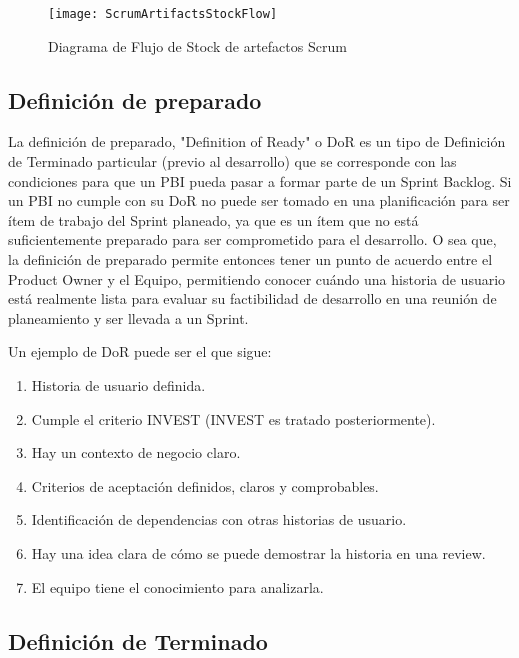 \begin{figure}[h]
  \centering
  \texttt{[image: ScrumArtifactsStockFlow]}
  \caption{Diagrama de Flujo de Stock de artefactos Scrum}
  \centering
  \label{fig:ScrumArtifactsStockFlow} %
\end{figure}

\subsection{Definición de preparado}

La definición de preparado, "Definition of Ready" o DoR es un tipo de Definición de Terminado particular (previo al desarrollo) que se corresponde con las condiciones para que un PBI pueda pasar a formar parte de un Sprint Backlog. Si un PBI no cumple con su DoR no puede ser tomado en una planificación para ser ítem de trabajo del Sprint planeado, ya que es un ítem que no está suficientemente preparado para ser comprometido para el desarrollo. O sea que, la definición de preparado permite entonces tener un punto de acuerdo entre el Product Owner y el Equipo, permitiendo conocer cuándo una historia de usuario está realmente lista para evaluar su factibilidad de desarrollo en una reunión de planeamiento y ser llevada a un Sprint.

Un ejemplo de DoR puede ser el que sigue:

\begin{enumerate}
\item{Historia de usuario definida.}
\item{Cumple el criterio INVEST (INVEST es tratado posteriormente).}
\item{Hay un contexto de negocio claro.}
\item{Criterios de aceptación definidos, claros y comprobables.}
\item{Identificación de dependencias con otras historias de usuario.}
\item{Hay una idea clara de cómo se puede demostrar la historia en una review.}
\item{El equipo tiene el conocimiento para analizarla.}
\end{enumerate}

\subsection{Definición de Terminado}

